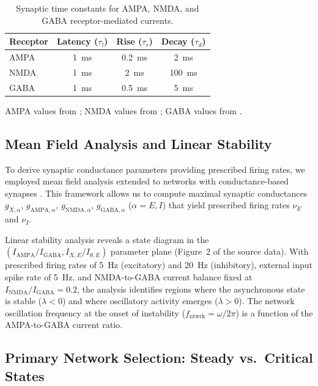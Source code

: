 \documentclass[10pt]{article}
\begin{document}
\begin{table}[htbp]
\centering
\caption{Synaptic time constants for AMPA, NMDA, and GABA receptor-mediated currents.}
\label{tab:synaptic_params}
\begin{tabular}{lccc}
\toprule
Receptor & Latency ($\tau_l$) & Rise ($\tau_r$) & Decay ($\tau_d$) \\
\midrule
AMPA & 1~ms & 0.2~ms & 2~ms \\
NMDA & 1~ms & 2~ms & 100~ms \\
GABA & 1~ms & 0.5~ms & 5~ms \\
\bottomrule
\end{tabular}
\begin{flushleft}
\footnotesize{AMPA values from \citet{zhou1998AMPA}; NMDA values from \citet{hestrin1990analysis}; GABA values from \citet{gupta2000organizing}.}
\end{flushleft}
\end{table}

\subsection{Mean Field Analysis and Linear Stability}

To derive synaptic conductance parameters providing prescribed firing rates, we employed mean field analysis \citep{amit1997model, brunel2000dynamics, renart2003mean} extended to networks with conductance-based synapses \citep{brunel2001effects}. This framework allows us to compute maximal synaptic conductances $g_{X,\alpha}$, $g_{\text{AMPA},\alpha}$, $g_{\text{NMDA},\alpha}$, $g_{\text{GABA},\alpha}$ ($\alpha = E, I$) that yield prescribed firing rates $\nu_E$ and $\nu_I$.

Linear stability analysis reveals a state diagram in the $(I_{\text{AMPA}}/I_{\text{GABA}}, I_{X,E}/I_{\theta,E})$ parameter plane (Figure~2 of the source data). With prescribed firing rates of 5~Hz (excitatory) and 20~Hz (inhibitory), external input spike rate of 5~Hz, and NMDA-to-GABA current balance fixed at $I_{\text{NMDA}}/I_{\text{GABA}} = 0.2$, the analysis identifies regions where the asynchronous state is stable ($\lambda < 0$) and where oscillatory activity emerges ($\lambda > 0$). The network oscillation frequency at the onset of instability ($f_{\text{ntwrk}} = \omega/2\pi$) is a function of the AMPA-to-GABA current ratio.

\subsection{Primary Network Selection: Steady vs.\ Critical States}
\end{document}
